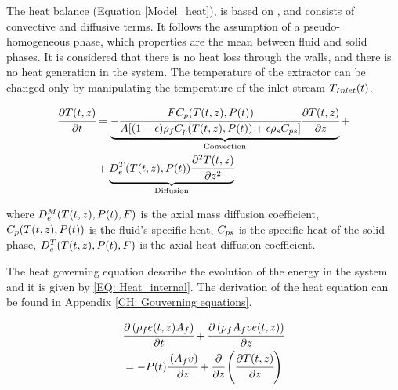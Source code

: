 \documentclass[../Article_Model_Parameters.tex]{subfiles}
\begin{document}
		{\color{black} The heat balance (Equation \ref{Model_heat}), is based on \citet{Srinivasan2012}, and consists of convective and diffusive terms. It follows the assumption of a pseudo-homogeneous phase, which properties are the mean between fluid and solid phases. It is considered that there is no heat loss through the walls, and there is no heat generation in the system. The temperature of the extractor can be changed only by manipulating the temperature of the inlet stream ${\color{black}T_{Inlet}}(t)$.
			}
			
			{\footnotesize
				\begin{equation} \label{Model_heat}
					\begin{split}
						\cfrac{\partial T(t,z)}{\partial t} &= 
						\underbrace{ -\cfrac{F {\color{black}C_p}(T(t,z),{\color{black}P}(t))}{{\color{black}A} 	[(1-{\color{black}\epsilon})\rho_f {\color{black}C_p} (T(t,z),{\color{black}P}(t)) + {\color{black} \epsilon \rho_s C_{ps} } ]} \cfrac{\partial T(t,z)}{\partial z}  }_{\text{Convection}} + \\
						& + \underbrace{ {\color{black}D^T_e}(T(t,z),{\color{black}P}(t)) \cfrac{\partial^2 T(t,z)}{\partial {\color{black}z^2}} }_{\text{Diffusion}}
					\end{split}
			\end{equation} }
			
		where $ {\color{black}D^M_e}(T(t,z),{\color{black}P}(t),F)$ is the axial mass diffusion coefficient, ${\color{black}C_p}(T(t,z),{\color{black}P}(t))$ is the fluid's specific heat, ${\color{black}C_{ps}}$ is the specific heat of the solid phase, ${\color{black}D^T_e}(T(t,z),{\color{black}P}(t),F)$ is the axial heat diffusion coefficient. 

		
			The heat governing equation describe the evolution of the energy in the system and it is given by \ref{EQ: Heat_internal}. The derivation of the heat equation can be found in Appendix \ref{CH: Gouverning equations}.
			
			{\footnotesize
			\begin{align} \label{EQ: Heat_internal}
				&\cfrac{\partial \left( \rho_f e(t,z) A_f \right) }{\partial t} + \cfrac{\partial \left( \rho_f A_f v e(t,z) \right)}{\partial z} \nonumber \\
				&= -{\color{black}P}(t)\cfrac{\left( A_f v \right)}{\partial z} + \cfrac{\partial}{\partial z} \left( \cfrac{\partial T(t,z)}{\partial z} \right) 
			\end{align}
			}
		
\end{document}
